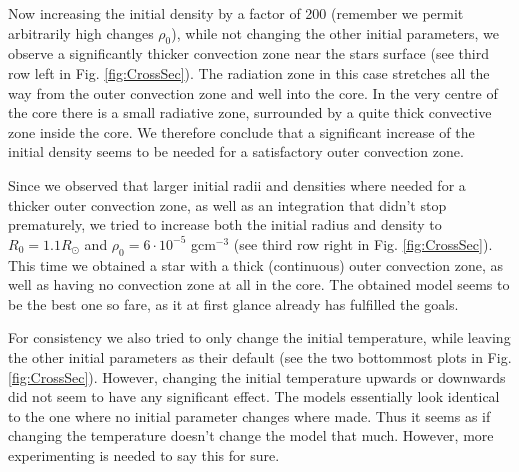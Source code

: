 \documentclass{emulateapj}
\begin{document}
	Now increasing the initial density by a factor of 200 (remember we permit arbitrarily high changes $\rho_0$), while not changing the other initial parameters, we observe a significantly thicker convection zone near the stars surface (see third row left in Fig. \ref{fig:CrossSec}). The radiation zone in this case stretches all the way from the outer convection zone and well into the core. In the very centre of the core there is a small radiative zone, surrounded by a quite thick convective zone inside the core. We therefore conclude that a significant increase of the initial density seems to be needed for a satisfactory outer convection zone. 
	
	Since we observed that larger initial radii and densities where needed for a thicker outer convection zone, as well as an integration that didn't stop prematurely, we tried to increase both the initial radius and density to $R_0 = 1.1 R_\odot$ and $\rho_0 = 6\cdot10^{-5}$ gcm$^{-3}$ (see third row right in Fig. \ref{fig:CrossSec}). This time we obtained a star with a thick (continuous) outer convection zone, as well as having no convection zone at all in the core. The obtained model seems to be the best one so fare, as it at first glance already has fulfilled the goals. 
	
	For consistency we also tried to only change the initial temperature, while leaving the other initial parameters as their default (see the two bottommost plots in Fig. \ref{fig:CrossSec}). However, changing the initial temperature upwards or downwards did not seem to have any significant effect. The models essentially look identical to the one where no initial parameter changes where made. Thus it seems as if changing the temperature doesn't change the model that much. However, more experimenting is needed to say this for sure. 
	
\end{document}
